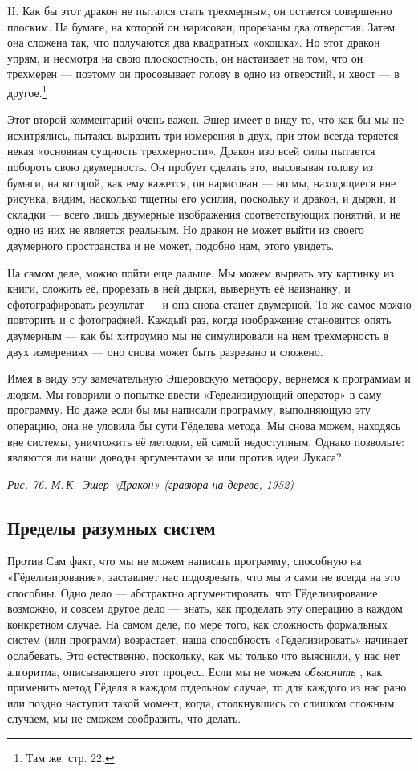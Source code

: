 \documentclass[../main.tex]{subfiles}
\begin{document}
II. Как бы этот дракон не пытался стать трехмерным, он остается совершенно плоским. На бумаге, на которой он нарисован, прорезаны два отверстия. Затем она сложена так, что получаются два квадратных «окошка». Но этот дракон упрям, и несмотря на свою плоскостность, он настаивает на том, что он трехмерен --- поэтому он просовывает голову в одно из отверстий, и хвост --- в другое.\footnote{Там же. стр. 22.}

Этот второй комментарий очень важен. Эшер имеет в виду то, что как бы мы не исхитрялись, пытаясь выразить три измерения в двух, при этом всегда теряется некая «основная сущность трехмерности». Дракон изо всей силы пытается побороть свою двумерность. Он пробует сделать это, высовывая голову из бумаги, на которой, как ему кажется, он нарисован --- но мы, находящиеся вне рисунка, видим, насколько тщетны его усилия, поскольку и дракон, и дырки, и складки --- всего лишь двумерные изображения соответствующих понятий, и не одно из них не является реальным. Но дракон не может выйти из своего двумерного пространства и не может, подобно нам, этого увидеть.

На самом деле, можно пойти еще дальше. Мы можем вырвать эту картинку из книги, сложить её, прорезать в ней дырки, вывернуть её наизнанку, и сфотографировать результат --- и она снова станет двумерной. То же самое можно повторить и с фотографией. Каждый раз, когда изображение становится опять двумерным --- как бы хитроумно мы не симулировали на нем трехмерность в двух измерениях --- оно снова может быть разрезано и сложено.

Имея в виду эту замечательную Эшеровскую метафору, вернемся к программам и людям. Мы говорили о попытке ввести «Геделизирующий оператор» в саму программу. Но даже если бы мы написали программу, выполняющую эту операцию, она не уловила бы сути Гёделева метода. Мы снова можем, находясь вне системы, уничтожить её методом, ей самой недоступным. Однако позвольте: являются ли наши доводы аргументами за или против идеи Лукаса?

\emph{Рис. 76. М.\,К.~Эшер «Дракон» (гравюра на дереве, 1952)}


\subsection{Пределы разумных систем}

Против Сам факт, что мы не можем написать программу, способную на «Гёделизирование», заставляет нас подозревать, что мы и сами не всегда на это способны. Одно дело --- абстрактно аргументировать, что Гёделизирование возможно, и совсем другое дело --- знать, как проделать эту операцию в каждом конкретном случае. На самом деле, по мере того, как сложность формальных систем (или программ) возрастает, наша способность «Геделизировать» начинает ослабевать. Это естественно, поскольку, как мы только что выяснили, у нас нет алгоритма, описывающего этот процесс. Если мы не можем \emph{объяснить} , как применить метод Гёделя в каждом отдельном случае, то для каждого из нас рано или поздно наступит такой момент, когда, столкнувшись со слишком сложным случаем, мы не сможем сообразить, что делать.
\end{document}
